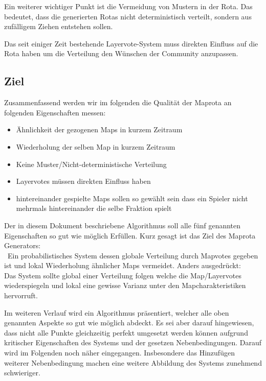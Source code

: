             Ein weiterer wichtiger Punkt ist die Vermeidung von Mustern in der Rota.
            Das bedeutet, dass die generierten Rotas nicht deterministisch verteilt, sondern aus zufälligem Ziehen entstehen sollen.

            Das seit einiger Zeit bestehende Layervote-System muss direkten Einfluss auf die Rota haben um die Verteilung den Wünschen der Community anzupassen.
        \newpage
        \subsection{Ziel}

        \label{sub:Ziele}
            Zusammenfassend werden wir im folgenden die Qualität der Maprota an folgenden Eigenschaften messen:
            \begin{itemize}
                \item Ähnlichkeit der gezogenen Maps in kurzem Zeitraum
                \item Wiederholung der selben Map in kurzem Zeitraum
                \item Keine Muster/Nicht-deterministische Verteilung
                \item Layervotes müssen direkten Einfluss haben
                \item hintereinander gespielte Maps sollen so gewählt sein dass ein Spieler nicht mehrmals hintereinander die selbe Fraktion spielt
            \end{itemize}

            Der in diesem Dokument beschriebene Algorithmus soll alle fünf genannten Eigenschaften so gut wie möglich Erfüllen.
            Kurz gesagt ist das Ziel des Maprota Generators:\\\
            \glqq{}Ein probabilistisches System dessen globale Verteilung durch Mapvotes gegeben ist und lokal Wiederholung ähnlicher Maps vermeidet.\grqq{}
            Anders ausgedrückt:\\
            Das System sollte global einer Verteilung folgen welche die Map/Layervotes wiederspiegeln und lokal eine gewisse Varianz unter den Mapcharakteristiken hervorruft.

            Im weiteren Verlauf wird ein Algorithmus präsentiert, welcher alle oben genannten Aspekte so gut wie möglich abdeckt.
            Es sei aber darauf hingewiesen, dass nicht alle Punkte gleichzeitig perfekt umgesetzt werden können aufgrund kritischer Eigenschaften des Systems und der gesetzen Nebenbedingungen.
            Darauf wird im Folgenden noch näher eingegangen. 
            Insbesondere das Hinzufügen weiterer Nebenbedingung machen eine weitere Abbildung des Systems zunehmend schwieriger.